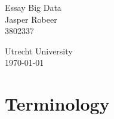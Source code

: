\documentclass[a4paper, 11pt]{article}
\begin{document}
\begin{titlepage}
    \begin{center}
        {\Huge \textsf{Essay Big Data}} \\[\baselineskip]
        {\large Jasper Robeer \\ 3802337}
    \end{center}
    \vfill
    {\large Utrecht University} \\
    \today
\end{titlepage}


\section{Terminology}

\end{document}
